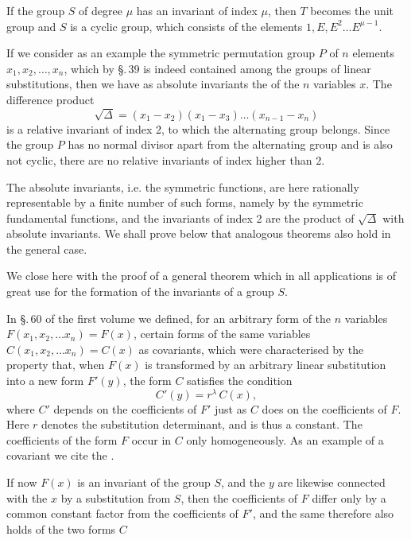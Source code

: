 If the group $S$ of degree $\mu$ has an invariant of index
 $\mu$, then $T$ becomes the unit group and $S$ is a cyclic
group, which consists of the elements $1, E, E^2 \ldots E^{\mu-1}$.

If we consider as an example the symmetric permutation group
 $P$ of $n$ elements $x_1,x_2,\ldots,x_n$, which by \S.\,39 is indeed contained
among the groups of linear substitutions, then we have
as absolute invariants the  of the
$n$ variables $x$. The difference product
\[
\sqrt{\varDelta} = (x_1-x_2)(x_1-x_3)\ldots(x_{n-1}-x_n)
\]
is a relative invariant of index 2, to which the alternating
group belongs. Since the group $P$ has no normal divisor
apart from the alternating group and is also not cyclic,
there are no relative invariants of index higher than 2.

The absolute invariants, i.e. the symmetric functions,
are here rationally representable by a finite number
of such forms, namely by the symmetric fundamental functions,
and the invariants of index 2 are the product
of $\sqrt{\varDelta}$ with absolute invariants. We shall prove below that analogous theorems also
hold in the general case.

We close here with the proof of a general
theorem which in all applications is of great use for the formation
of the invariants of a group $S$.

In \S.\,60 of the first volume we defined, for an arbitrary form
of the $n$ variables $F(x_1,x_2,\ldots x_n) = F(x)$, certain forms of the same
 variables $C(x_1,x_2,\ldots x_n) = C(x)$ as covariants,
which were characterised by the property that, when $F(x)$ is transformed
by an arbitrary linear substitution into a new form $F'(y)$,
 the form $C$ satisfies the condition
\[
C'(y) = r^\lambda\,C(x),
\]
where $C'$ depends on the coefficients of $F'$ just as $C$ does on the
coefficients of $F$. Here $r$ denotes the substitution determinant,
and is thus a constant. The coefficients of the
form $F$ occur in $C$ only homogeneously. As an example of a covariant
 we cite the .

If now $F(x)$ is an invariant of the group $S$, and the
$y$ are likewise connected with the $x$ by a substitution from $S$,
then the coefficients of $F$ differ only by
a common constant factor from the coefficients
of $F'$, and the same therefore also holds of the two forms $C$
